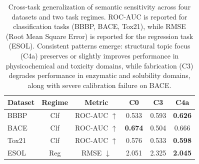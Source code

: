 \begin{table}[t]
\centering
\caption{Cross-task generalization of semantic sensitivity across four datasets and two task regimes. ROC-AUC is reported for classification tasks (BBBP, BACE, Tox21), while RMSE (Root Mean Square Error) is reported for the regression task (ESOL). Consistent patterns emerge: structural topic focus (C4a) preserves or slightly improves performance in physicochemical and toxicity domains, while fabrication (C3) degrades performance in enzymatic and solubility domains, along with severe calibration failure on BACE.}
\label{tab:generalization}
\begin{tabular}{lccccc}
\toprule
\textbf{Dataset} & \textbf{Regime} & \textbf{Metric} & \textbf{C0} & \textbf{C3} & \textbf{C4a} \\ \midrule
BBBP  & Clf & ROC-AUC $\uparrow$ & 0.533 & 0.593 & \textbf{0.626} \\
BACE  & Clf & ROC-AUC $\uparrow$ & \textbf{0.674} & 0.504 & 0.666 \\
Tox21 & Clf & ROC-AUC $\uparrow$ & 0.576 & 0.533 & \textbf{0.598} \\ \midrule
ESOL  & Reg & RMSE $\downarrow$ & 2.051 & 2.325 & \textbf{2.045} \\
\bottomrule
\end{tabular}
\end{table}

